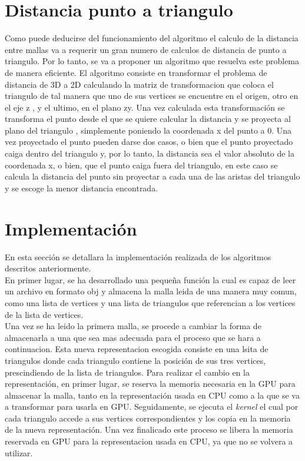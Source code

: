 \documentclass[10pt,oneside,a4paper]{article}
\begin{document}
\section{Distancia punto a triangulo}
Como puede deducirse del funcionamiento del algoritmo el calculo de la distancia entre mallas va a requerir un gran numero de calculos de distancia de punto a triangulo. Por lo tanto, se va a proponer un algoritmo que resuelva este problema de manera eficiente. El algoritmo consiste en transformar el problema de distancia de 3D a 2D calculando la matriz de transformacion que coloca el triangulo de tal manera que uno de sus vertices se encuentre en el origen, otro en el eje z , y el ultimo, en el plano zy. Una vez calculada esta transformación se transforma el punto desde el que se quiere calcular la distancia y se proyecta al plano del triangulo , simplemente poniendo la coordenada x del punto a 0. Una vez proyectado el punto pueden darse dos casos, o bien que el punto proyectado caiga dentro del triangulo y, por lo tanto, la distancia sea el valor absoluto de la coordenada x, o bien, que el punto caiga fuera del triangulo, en este caso se calcula la distancia del punto sin proyectar a cada una de las aristas del triangulo y se escoge la menor distancia encontrada.
\section{Implementación}
En esta sección se detallara la implementación realizada de los algoritmos descritos anteriormente.\\

En primer lugar, se ha desarrollado una pequeña función la cual es capaz de leer un archivo en formato obj y almacena la malla leida de una manera muy comun, como una lista de vertices y una lista de triangulos que referencian a los vertices de la lista de vertices.\\

Una vez se ha leido la primera malla, se procede a cambiar la forma de almacenarla a una que sea mas adecuada para el proceso que se hara a continuacion. Esta nueva representacion escogida consiste en una lsita de triangulos donde cada triangulo contiene la posición de sus tres vertices, prescindiendo de la lista de triangulos. Para realizar el cambio en la representación, en primer lugar, se reserva la memoria necesaria en la GPU para almacenar la malla, tanto en la representación usada en CPU como a la que se va a transformar para usarla en GPU. Seguidamente, se ejecuta el \textit{kernel} el cual por cada triangulo accede a sus vertices correspondientes y los copia en la memoria de la nueva representación. Una vez finalicado este proceso se libera la memoria reservada en GPU para la representacion usada en CPU, ya que no se volvera a utilizar.\\
\end{document}
